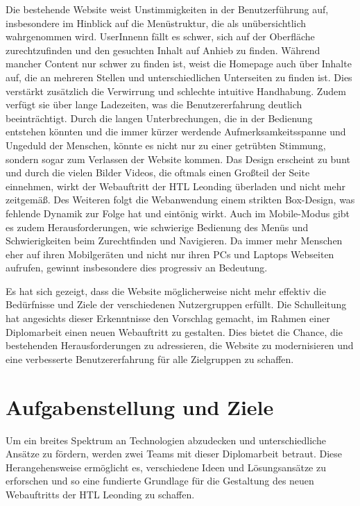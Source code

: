 Die bestehende Website weist Unstimmigkeiten in der Benutzerführung auf, 
insbesondere im Hinblick auf die Menüstruktur, die als unübersichtlich wahrgenommen wird. 
UserInnenn fällt es schwer, sich auf der Oberfläche zurechtzufinden und den gesuchten Inhalt auf Anhieb zu finden. 
Während mancher Content nur schwer zu finden ist, weist die Homepage auch über Inhalte auf, 
die an mehreren Stellen und unterschiedlichen Unterseiten zu finden ist. Dies verstärkt zusätzlich 
die Verwirrung und schlechte intuitive Handhabung. Zudem verfügt sie über lange Ladezeiten, was die 
Benutzererfahrung deutlich beeinträchtigt. Durch die langen Unterbrechungen, 
die in der Bedienung entstehen könnten und die immer kürzer werdende Aufmerksamkeitsspanne und Ungeduld der Menschen, 
könnte es nicht nur zu einer getrübten Stimmung, sondern sogar zum Verlassen der Website kommen. Das Design erscheint 
zu bunt und durch die vielen Bilder Videos, die oftmals einen Großteil der Seite einnehmen, 
wirkt der Webauftritt der HTL Leonding überladen und nicht mehr zeitgemäß. Des Weiteren folgt die Webanwendung einem strikten
Box-Design, was fehlende Dynamik zur Folge hat und eintönig wirkt. Auch im Mobile-Modus gibt es zudem Herausforderungen,
wie schwierige Bedienung des Menüs und Schwierigkeiten beim Zurechtfinden und Navigieren. Da immer mehr Menschen eher auf 
ihren Mobilgeräten und nicht nur ihren PCs und Laptops Webseiten aufrufen, gewinnt insbesondere dies progressiv an Bedeutung.

Es hat sich gezeigt, dass die Website möglicherweise nicht mehr effektiv die Bedürfnisse und 
Ziele der verschiedenen Nutzergruppen erfüllt. Die Schulleitung hat angesichts dieser Erkenntnisse den Vorschlag gemacht, 
im Rahmen einer Diplomarbeit einen neuen Webauftritt zu gestalten. Dies bietet die Chance, die bestehenden 
Herausforderungen zu adressieren, die Website zu modernisieren und eine verbesserte Benutzererfahrung für alle Zielgruppen zu schaffen.


\section{Aufgabenstellung und Ziele}
Um ein breites Spektrum an Technologien abzudecken und unterschiedliche Ansätze zu fördern, werden zwei Teams mit dieser Diplomarbeit betraut. 
Diese Herangehensweise ermöglicht es, verschiedene Ideen und Lösungsansätze zu erforschen und so eine fundierte Grundlage für die Gestaltung 
des neuen Webauftritts der HTL Leonding zu schaffen.

